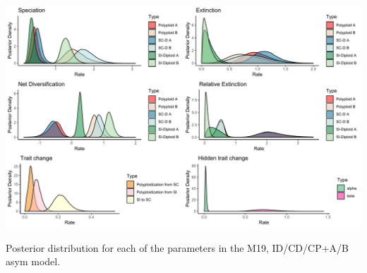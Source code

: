 \begin{suppfigure}
\includegraphics[width=\textwidth]{muhissenodipasymposteriordist.pdf}
\caption{Posterior distribution for each of the parameters in the M19, ID/CD/CP+A/B asym model.} %
\label{suppfigure:IDCDCPnodipAB}
\end{suppfigure}

